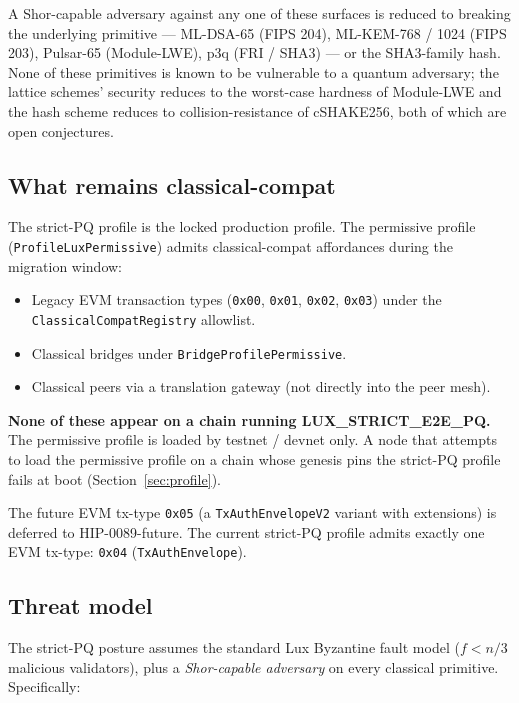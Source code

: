 A Shor-capable adversary against any one of these surfaces is reduced to
breaking the underlying primitive --- ML-DSA-65 (FIPS 204), ML-KEM-768 / 1024
(FIPS 203), Pulsar-65 (Module-LWE), p3q (FRI / SHA3) --- or the
SHA3-family hash. None of these primitives is known to be vulnerable to a
quantum adversary; the lattice schemes' security reduces to the worst-case
hardness of Module-LWE \cite{regev2009,mlwe} and the hash scheme reduces
to collision-resistance of cSHAKE256, both of which are open conjectures.

\subsection{What remains classical-compat}

The strict-PQ profile is the locked production profile. The permissive
profile (\texttt{ProfileLuxPermissive}) admits classical-compat affordances
during the migration window:

\begin{itemize}[leftmargin=2em,nosep]
  \item Legacy EVM transaction types (\texttt{0x00}, \texttt{0x01},
    \texttt{0x02}, \texttt{0x03}) under the \texttt{ClassicalCompatRegistry}
    allowlist.
  \item Classical bridges under \texttt{BridgeProfilePermissive}.
  \item Classical peers via a translation gateway (not directly into the
    peer mesh).
\end{itemize}

\textbf{None of these appear on a chain running LUX\_STRICT\_E2E\_PQ.}
The permissive profile is loaded by testnet / devnet only. A node that
attempts to load the permissive profile on a chain whose genesis pins the
strict-PQ profile fails at boot (Section~\ref{sec:profile}).

The future EVM tx-type \texttt{0x05} (a \texttt{TxAuthEnvelopeV2} variant
with extensions) is deferred to HIP-0089-future. The current strict-PQ
profile admits exactly one EVM tx-type: \texttt{0x04}
(\texttt{TxAuthEnvelope}).

\subsection{Threat model}

The strict-PQ posture assumes the standard Lux Byzantine fault model
($f < n/3$ malicious validators), plus a \emph{Shor-capable adversary} on
every classical primitive. Specifically:

